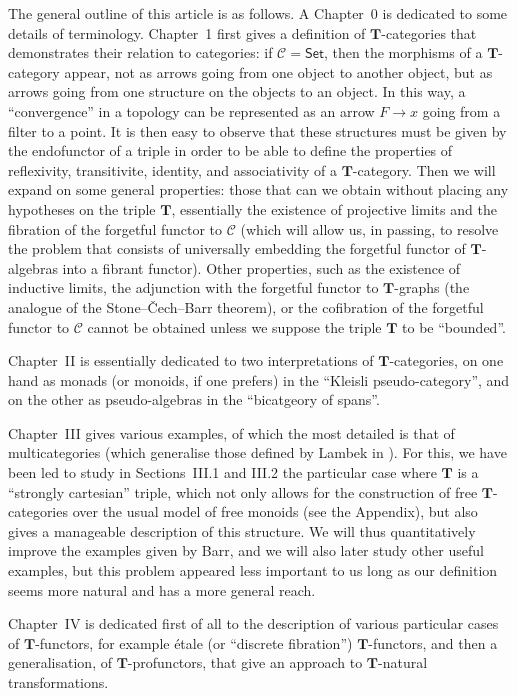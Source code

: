 \documentclass{article}
\newcommand{\oldpage}[1]{\marginpar{\footnotesize$\Big\vert$ \textit{p.~#1}}}
\newcommand{\TT}{\mathbf{T}}
\newcommand{\cat}[1]{\mathcal{#1}}
\newcommand{\Cat}[1]{\mathsf{#1}}
\begin{document}
\oldpage{216}
The general outline of this article is as follows.
A Chapter~0 is dedicated to some details of terminology.
Chapter~1 first gives a definition of $\TT$-categories that demonstrates their relation to categories: if $\cat{C}=\Cat{Set}$, then the morphisms of a $\TT$-category appear, not as arrows going from one object to another object, but as arrows going from one structure on the objects to an object.
In this way, a ``convergence'' in a topology can be represented as an arrow $F\to x$ going from a filter to a point.
It is then easy to observe that these structures must be given by the endofunctor of a triple in order to be able to define the properties of reflexivity, transitivite, identity, and associativity of a $\TT$-category.
Then we will expand on some general properties: those that can we obtain without placing any hypotheses on the triple $\TT$, essentially the existence of projective limits and the fibration of the forgetful functor to $\cat{C}$ (which will allow us, in passing, to resolve the problem that consists of universally embedding the forgetful functor of $\TT$-algebras into a fibrant functor).
Other properties, such as the existence of inductive limits, the adjunction with the forgetful functor to $\TT$-graphs (the analogue of the Stone--Čech--Barr theorem), or the cofibration of the forgetful functor to $\cat{C}$ cannot be obtained unless we suppose the triple $\TT$ to be ``bounded''.

Chapter~II is essentially dedicated to two interpretations of $\TT$-categories, on one hand as monads (or monoids, if one prefers) in the ``Kleisli pseudo-category'', and on the other as pseudo-algebras in the ``bicatgeory of spans''.

Chapter~III gives various examples, of which the most detailed is that of multicategories (which generalise those defined by Lambek in \cite{La}).
For this, we have been led to study in Sections~III.1 and III.2 the particular case where $\TT$ is a ``strongly cartesian'' triple, which not only allows for the construction of free $\TT$-categories over the usual model of free monoids (see the Appendix), but also gives a manageable description of this structure.
\oldpage{217}
We will thus quantitatively improve the examples given by Barr, and we will also later study other useful examples, but this problem appeared less important to us long as our definition seems more natural and has a more general reach.

Chapter~IV is dedicated first of all to the description of various particular cases of $\TT$-functors, for example étale (or ``discrete fibration'') $\TT$-functors, and then a generalisation, of $\TT$-profunctors, that give an approach to $\TT$-natural transformations.
\end{document}
